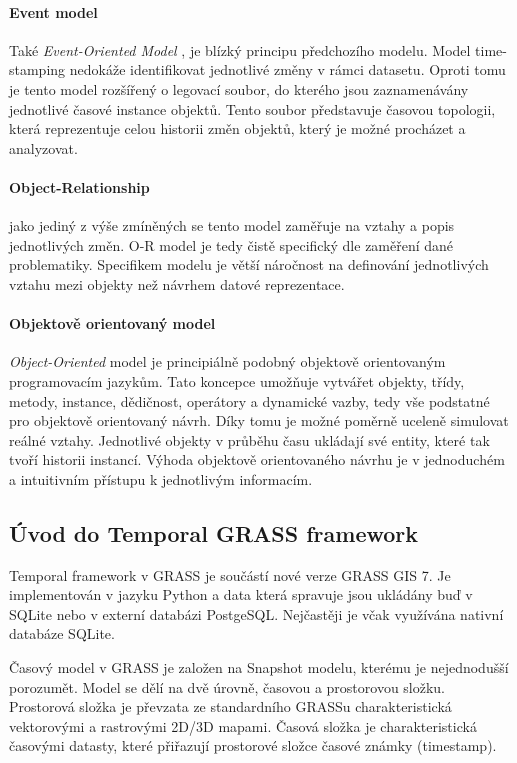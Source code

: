 \documentclass[a4paper,12pt,oneside]{report}
\begin{document}
\paragraph*{Event model}
Také \textit{Event-Oriented Model }, je blízký principu předchozího modelu. Model time-stamping nedokáže identifikovat jednotlivé změny v rámci datasetu. Oproti tomu je tento model rozšířený  o legovací soubor, do kterého jsou zaznamenávány jednotlivé časové instance objektů. Tento soubor představuje časovou topologii, která reprezentuje celou historii změn objektů, který je možné procházet a analyzovat.

\paragraph*{Object-Relationship}
jako jediný z výše zmíněných se tento model zaměřuje na vztahy a popis jednotlivých změn. O-R model je tedy čistě specifický dle zaměření dané problematiky. Specifikem  modelu je větší náročnost na definování jednotlivých vztahu mezi objekty než návrhem datové reprezentace. 

\paragraph*{Objektově orientovaný model}
\textit{Object-Oriented} model je principiálně podobný objektově orientovaným programovacím jazykům. Tato koncepce umožňuje vytvářet  objekty, třídy, metody, instance, dědičnost, operátory a dynamické vazby, tedy vše podstatné pro objektově orientovaný návrh. Díky tomu je možné poměrně uceleně simulovat reálné vztahy.  Jednotlivé objekty v průběhu času ukládají své entity, které tak tvoří historii instancí. Výhoda objektově orientovaného návrhu je v jednoduchém a intuitivním přístupu k jednotlivým informacím. 



\subsection{Úvod do Temporal GRASS framework}
Temporal framework v GRASS je součástí nové verze GRASS GIS 7. Je implementován v jazyku Python a data která spravuje jsou ukládány buď v SQLite nebo v externí databázi PostgeSQL. Nejčastěji je včak využívána nativní databáze SQLite.

Časový model v GRASS je založen na Snapshot modelu, kterému je  nejednodušší porozumět. Model se dělí na dvě úrovně, časovou a prostorovou složku. Prostorová složka je převzata ze standardního  GRASSu charakteristická vektorovými a rastrovými 2D/3D mapami. Časová složka je charakteristická časovými datasty, které přiřazují prostorové složce časové známky (timestamp).
\end{document}
